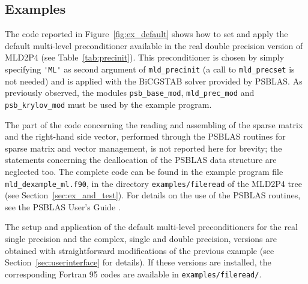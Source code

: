 \subsection{Examples\label{sec:examples}}

The code reported in Figure~\ref{fig:ex_default} shows how to set and apply the default
multi-level preconditioner available in the real double precision version
of MLD2P4 (see Table~\ref{tab:precinit}). This preconditioner is chosen
by simply specifying \verb|'ML'| as second argument of \verb|mld_precinit|
(a call to \verb|mld_precset| is not needed) and is applied with the BiCGSTAB
solver provided by PSBLAS. As previously observed, the modules \verb|psb_base_mod|,
\verb|mld_prec_mod| and \verb|psb_krylov_mod| must be used by the example program.
 
The part of the code concerning the
reading and assembling of the sparse matrix and the right-hand side vector, performed
through the PSBLAS routines for sparse matrix and vector management, is not reported
here for brevity; the statements concerning the deallocation of the PSBLAS
data structure are neglected too.
The complete code can be found in the example program file \verb|mld_dexample_ml.f90|,
in the directory \verb|examples/fileread| of the MLD2P4 tree (see
Section~\ref{sec:ex_and_test}).
For details on the use of the PSBLAS routines, see the PSBLAS User's
Guide \cite{PSBLASGUIDE}.

The setup and application of the default multi-level
preconditioners for the real single precision and the complex, single and double
precision, versions are obtained with straightforward modifications of the previous
example (see Section~\ref{sec:userinterface} for details). If these versions are installed,
the corresponding Fortran 95 codes are available in \verb|examples/fileread/|.

